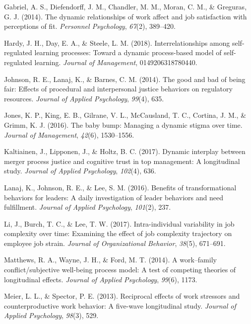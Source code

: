 \documentclass[english,,man]{apa6}
\theoremstyle{definition}
\theoremstyle{definition}
\theoremstyle{definition}
\theoremstyle{remark}
\begin{document}
\leavevmode\hypertarget{ref-gabriel2014}{}%
Gabriel, A. S., Diefendorff, J. M., Chandler, M. M., Moran, C. M., \&
Greguras, G. J. (2014). The dynamic relationships of work affect and job
satisfaction with perceptions of fit. \emph{Personnel Psychology},
\emph{67}(2), 389--420.

\leavevmode\hypertarget{ref-hardy2018}{}%
Hardy, J. H., Day, E. A., \& Steele, L. M. (2018). Interrelationships
among self-regulated learning processes: Toward a dynamic process-based
model of self-regulated learning. \emph{Journal of Management},
0149206318780440.

\leavevmode\hypertarget{ref-johnson2014}{}%
Johnson, R. E., Lanaj, K., \& Barnes, C. M. (2014). The good and bad of
being fair: Effects of procedural and interpersonal justice behaviors on
regulatory resources. \emph{Journal of Applied Psychology},
\emph{99}(4), 635.

\leavevmode\hypertarget{ref-jones2016}{}%
Jones, K. P., King, E. B., Gilrane, V. L., McCausland, T. C., Cortina,
J. M., \& Grimm, K. J. (2016). The baby bump: Managing a dynamic stigma
over time. \emph{Journal of Management}, \emph{42}(6), 1530--1556.

\leavevmode\hypertarget{ref-kaltiainen2017}{}%
Kaltiainen, J., Lipponen, J., \& Holtz, B. C. (2017). Dynamic interplay
between merger process justice and cognitive trust in top management: A
longitudinal study. \emph{Journal of Applied Psychology}, \emph{102}(4),
636.

\leavevmode\hypertarget{ref-Lanaj2016}{}%
Lanaj, K., Johnson, R. E., \& Lee, S. M. (2016). Benefits of
transformational behaviors for leaders: A daily investigation of leader
behaviors and need fulfillment. \emph{Journal of Applied Psychology},
\emph{101}(2), 237.

\leavevmode\hypertarget{ref-li2017}{}%
Li, J., Burch, T. C., \& Lee, T. W. (2017). Intra-individual variability
in job complexity over time: Examining the effect of job complexity
trajectory on employee job strain. \emph{Journal of Organizational
Behavior}, \emph{38}(5), 671--691.

\leavevmode\hypertarget{ref-matthews2014}{}%
Matthews, R. A., Wayne, J. H., \& Ford, M. T. (2014). A work--family
conflict/subjective well-being process model: A test of competing
theories of longitudinal effects. \emph{Journal of Applied Psychology},
\emph{99}(6), 1173.

\leavevmode\hypertarget{ref-meier2013}{}%
Meier, L. L., \& Spector, P. E. (2013). Reciprocal effects of work
stressors and counterproductive work behavior: A five-wave longitudinal
study. \emph{Journal of Applied Psychology}, \emph{98}(3), 529.
\end{document}
